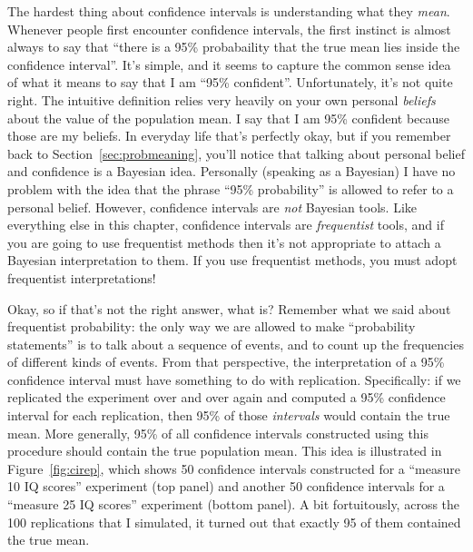 
The hardest thing about confidence intervals is understanding what they {\it mean}. Whenever people first encounter confidence intervals, the first instinct is almost always to say that ``there is a 95\% probabaility that the true mean lies inside the confidence interval''. It's simple, and it seems to capture the common sense idea of what it means to say that I am ``95\% confident''. Unfortunately, it's not quite right. The intuitive definition relies very heavily on your own personal {\it beliefs} about the value of the population mean. I say that I am 95\% confident because those are my beliefs. In everyday life that's perfectly okay, but if you remember back to Section~\ref{sec:probmeaning}, you'll notice that talking about personal belief and confidence is a Bayesian idea. Personally (speaking as a Bayesian) I have no problem with the idea that the phrase ``95\% probability'' is allowed to refer to a personal belief. However, confidence intervals are {\it not} Bayesian tools. Like everything else in this chapter, confidence intervals are {\it frequentist} tools, and if you are going to use frequentist methods then it's not appropriate to attach a Bayesian interpretation to them. If you use frequentist methods, you must adopt frequentist interpretations!

Okay, so if that's not the right answer, what is? Remember what we said about frequentist probability: the only way we are allowed to make ``probability statements'' is to talk about a sequence of events, and to count up the frequencies of different kinds of events. From that perspective, the interpretation of a 95\% confidence interval must have something to do with replication. Specifically: if we replicated the experiment over and over again and computed a 95\% confidence interval for each replication, then 95\% of those {\it intervals} would contain the true mean. More generally, 95\% of all confidence intervals constructed using this procedure should contain the true population mean. This idea is illustrated in Figure~\ref{fig:cirep}, which shows 50 confidence intervals constructed for a ``measure 10 IQ scores'' experiment (top panel) and another 50 confidence intervals for a ``measure 25 IQ scores'' experiment (bottom panel). A bit fortuitously, across the 100 replications that I simulated, it turned out that exactly 95 of them contained the true mean. 



